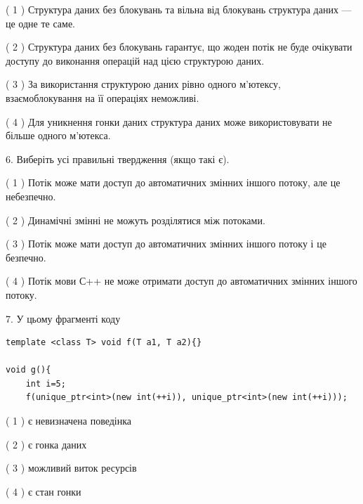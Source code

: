 \documentclass[12pt, ukrainian]{article}
\begin{document}
\begin {large}
{( 1 ) Структура даних без блокувань та вільна від блокувань структура даних --- це одне те саме.%

( 2 ) Структура даних без блокувань гарантує, що жоден потік не буде очікувати доступу до виконання операцій над цією структурою даних.%

( 3 ) За використання структурою даних рівно одного м’ютексу, взаємоблокування на її операціях неможливі.%

( 4 ) Для уникнення гонки даних структура даних може використовувати не більше одного м’ютекса.%
\newpage



\vspace{5mm}
6. Виберіть усі правильні твердження (якщо такі є).\par
\vspace{2mm}

( 1 ) Потік може мати доступ до автоматичних змінних іншого потоку, але це небезпечно.%

( 2 ) Динамічні змінні не можуть розділятися між потоками.%

( 3 ) Потік може мати доступ до автоматичних змінних іншого потоку і це безпечно.%

( 4 ) Потік мови С++ не може отримати доступ до автоматичних змінних іншого потоку.%


\vspace{5mm}
7. У цьому фрагменті коду
\begin{verbatim}
template <class T> void f(T a1, T a2){}

void g(){
    int i=5;
    f(unique_ptr<int>(new int(++i)), unique_ptr<int>(new int(++i)));
\end{verbatim}

( 1 ) є невизначена поведінка%

( 2 ) є гонка даних%

( 3 ) можливий виток ресурсів%

( 4 ) є стан гонки%
}
\end {large}
\end{document}
